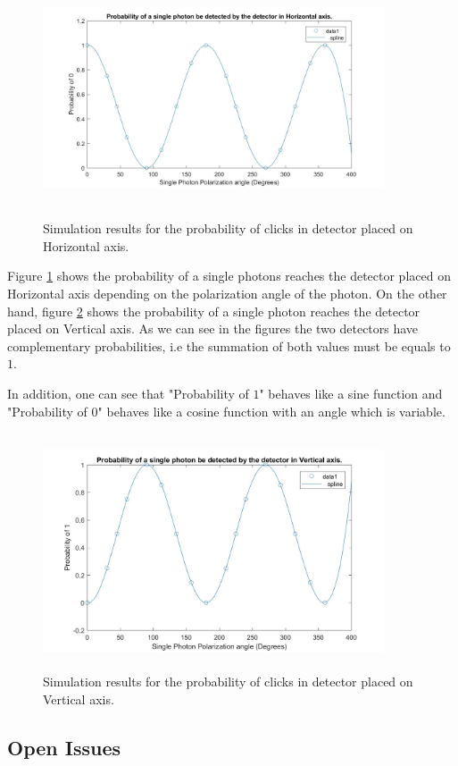 \begin{figure}[H]
	\centering
	\includegraphics[width=0.9\textwidth, height=7cm]{./sdf/qrng/figures_raw/probx.jpg}
	\caption{Simulation results for the probability of clicks in detector placed on Horizontal axis.}\label{probx}
\end{figure}
Figure \ref{probx} shows the probability of a single photons reaches the detector placed on Horizontal axis depending on the polarization angle of the photon. On the other hand, figure \ref{proby} shows the probability of a single photon reaches the detector placed on Vertical axis. As we can see in the figures the two detectors have complementary probabilities, i.e the summation of both values must be equals to $1$.

In addition, one can see that "Probability of $1$" behaves like a sine function and "Probability of 0" behaves like a cosine function with an angle which is variable.


\begin{figure}[h]
	\centering
	\includegraphics[width=0.9\textwidth, height=7cm]{./sdf/qrng/figures_raw/proby.jpg}
	\caption{Simulation results for the probability of clicks in detector placed on Vertical axis.}\label{proby}
\end{figure}

\subsection{Open Issues}


\newpage




\cleardoublepage
